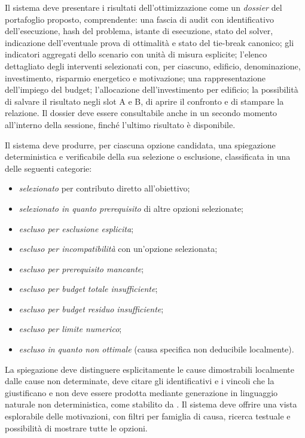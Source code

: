  \label{rf:risultati}
Il sistema deve presentare i risultati dell'ottimizzazione come un \emph{dossier} del portafoglio proposto, comprendente: una fascia di audit con identificativo dell'esecuzione, hash del problema, istante di esecuzione, stato del solver, indicazione dell'eventuale prova di ottimalità e stato del tie-break canonico; gli indicatori aggregati dello scenario con unità di misura esplicite; l'elenco dettagliato degli interventi selezionati con, per ciascuno, edificio, denominazione, investimento, risparmio energetico e motivazione; una rappresentazione dell'impiego del budget; l'allocazione dell'investimento per edificio; la possibilità di salvare il risultato negli slot A e B, di aprire il confronto e di stampare la relazione. Il dossier deve essere consultabile anche in un secondo momento all'interno della sessione, finché l'ultimo risultato è disponibile.

 \label{rf:spiegazioni}
Il sistema deve produrre, per ciascuna opzione candidata, una spiegazione deterministica e verificabile della sua selezione o esclusione, classificata in una delle seguenti categorie:
\begin{itemize}[leftmargin=1.4em, itemsep=0.15em]
    \item \emph{selezionato} per contributo diretto all'obiettivo;
    \item \emph{selezionato in quanto prerequisito} di altre opzioni selezionate;
    \item \emph{escluso per esclusione esplicita};
    \item \emph{escluso per incompatibilità} con un'opzione selezionata;
    \item \emph{escluso per prerequisito mancante};
    \item \emph{escluso per budget totale insufficiente};
    \item \emph{escluso per budget residuo insufficiente};
    \item \emph{escluso per limite numerico};
    \item \emph{escluso in quanto non ottimale} (causa specifica non deducibile localmente).
\end{itemize}
La spiegazione deve distinguere esplicitamente le cause dimostrabili localmente dalle cause non determinate, deve citare gli identificativi e i vincoli che la giustificano e non deve essere prodotta mediante generazione in linguaggio naturale non deterministica, come stabilito da . Il sistema deve offrire una vista esplorabile delle motivazioni, con filtri per famiglia di causa, ricerca testuale e possibilità di mostrare tutte le opzioni.

